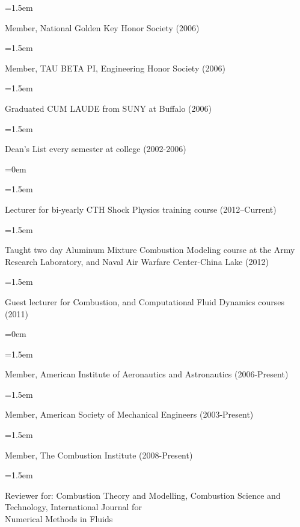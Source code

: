 \documentclass{scrartcl}
\newcommand{\NewAward}[1]{\hangindent=1.5em\hangafter=0\noindent\raggedright\footnotesize{#1}\par\normalsize\vspace{0.75em}} %
\begin{document}
\begin{cv}{}


\begin{mdframed}[
  linecolor=white,%
  leftmargin =-0cm,
  rightmargin =+0cm,
]

\noindent{}\vspace{0.5em}

\NewAward{Member, National Golden Key Honor Society (2006)}

\NewAward{Member, TAU BETA PI, Engineering Honor Society (2006)}

\NewAward{Graduated CUM LAUDE from SUNY at Buffalo (2006)}

\NewAward{Dean's List every semester at college (2002-2006)}

\vspace{0.5em} %

\noindent\hangindent=0em \vspace{0.5em}

\NewAward{Lecturer for bi-yearly CTH Shock Physics training course (2012--Current)}

\NewAward{Taught two day Aluminum Mixture Combustion Modeling course at the Army Research Laboratory, and Naval Air Warfare Center-China Lake (2012)}

\NewAward{Guest lecturer for Combustion, and Computational Fluid Dynamics courses (2011)}

\vspace{0.5em} %

\noindent\hangindent=0em \vspace{0.5em}

\NewAward{Member, American Institute of Aeronautics and Astronautics (2006-Present)}

\NewAward{Member, American Society of Mechanical Engineers (2003-Present)}

\NewAward{Member, The Combustion Institute (2008-Present)}

\NewAward{Reviewer for: Combustion Theory and Modelling, Combustion Science and Technology, International Journal for \\ \hspace{2.5em}Numerical Methods in Fluids}


\end{mdframed}
\end{cv}
\end{document}
